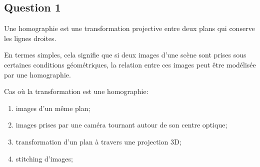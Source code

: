 \documentclass[class=article, crop=false]{standalone}
\begin{document}
\subsection*{Question 1}
\begin{definition}
    Une homographie est une transformation projective entre deux plans qui conserve les lignes droites.
\end{definition}
\noindent En termes simples, cela signifie que si deux images d'une scène sont prises sous certaines conditions géométriques, la relation entre ces images peut être modélisée par une homographie.
\begin{example}
    Cas où la transformation est une homographie:
    \begin{enumerate}[noitemsep]
        \item images d'un même plan;
        \item images prises par une caméra tournant autour de son centre optique;
        \item transformation d'un plan à travers une projection 3D;
        \item stitching d'images;
    \end{enumerate}
\end{example}
\end{document}

